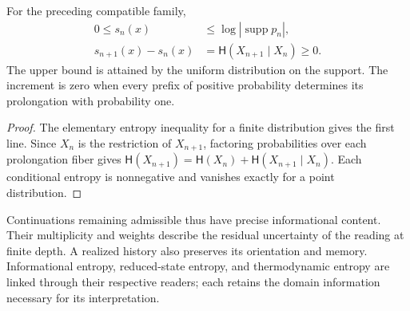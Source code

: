 \begin{proposition}
For the preceding compatible family,
\begin{align}
 0\leq s_n(x)&\leq\log|\operatorname{supp}p_n|,\\
 s_{n+1}(x)-s_n(x)
 &=\mathsf H(X_{n+1}\mid X_n)\geq0.
 \label{ii:eq:ii-entropia-refinamiento}
\end{align}
The upper bound is attained by the uniform distribution on the
support. The increment is zero when every prefix of positive
probability determines its prolongation with probability one.
\end{proposition}
\begin{proof}
The elementary entropy inequality for a finite distribution
gives the first line. Since \(X_n\) is the restriction of \(X_{n+1}\),
factoring probabilities over each prolongation fiber
gives \(\mathsf H(X_{n+1})=\mathsf H(X_n)+
\mathsf H(X_{n+1}\mid X_n)\). Each conditional entropy is
nonnegative and vanishes exactly for a point distribution.
\end{proof}

Continuations remaining admissible thus have precise
informational content. Their multiplicity and weights describe the
residual uncertainty of the reading at finite depth. A
realized history also preserves its orientation and memory.
Informational entropy, reduced-state entropy, and thermodynamic
entropy are linked through their respective readers; each
retains the domain information necessary for its interpretation.
